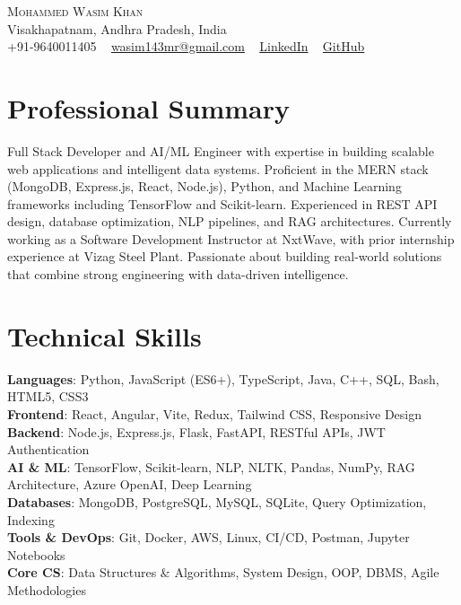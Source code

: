 \documentclass[letterpaper,11pt]{article}
\begin{document}
\begin{center}
  {\Huge \scshape Mohammed Wasim Khan} \\ \vspace{1pt}
  Visakhapatnam, Andhra Pradesh, India \\ \vspace{1pt}
  \small +91-9640011405 ~
  \href{mailto:wasim143mr@gmail.com}{wasim143mr@gmail.com} ~
  \href{https://linkedin.com/in/mohammed-wasim-khan-757595245}{LinkedIn} ~
  \href{https://github.com/wasim-builds}{GitHub}
  \vspace{-8pt}
\end{center}

\section{Professional Summary}
Full Stack Developer and AI/ML Engineer with expertise in building scalable web applications and intelligent data systems. Proficient in the MERN stack (MongoDB, Express.js, React, Node.js), Python, and Machine Learning frameworks including TensorFlow and Scikit-learn. Experienced in REST API design, database optimization, NLP pipelines, and RAG architectures. Currently working as a Software Development Instructor at NxtWave, with prior internship experience at Vizag Steel Plant. Passionate about building real-world solutions that combine strong engineering with data-driven intelligence.

\section{Technical Skills}
\begin{itemize}[leftmargin=0.15in, label={}]
  \small{\item{
    \textbf{Languages}{: Python, JavaScript (ES6+), TypeScript, Java, C++, SQL, Bash, HTML5, CSS3} \\
    \textbf{Frontend}{: React, Angular, Vite, Redux, Tailwind CSS, Responsive Design} \\
    \textbf{Backend}{: Node.js, Express.js, Flask, FastAPI, RESTful APIs, JWT Authentication} \\
    \textbf{AI \& ML}{: TensorFlow, Scikit-learn, NLP, NLTK, Pandas, NumPy, RAG Architecture, Azure OpenAI, Deep Learning} \\
    \textbf{Databases}{: MongoDB, PostgreSQL, MySQL, SQLite, Query Optimization, Indexing} \\
    \textbf{Tools \& DevOps}{: Git, Docker, AWS, Linux, CI/CD, Postman, Jupyter Notebooks} \\
    \textbf{Core CS}{: Data Structures \& Algorithms, System Design, OOP, DBMS, Agile Methodologies}
  }}
\end{itemize}
\vspace{-16pt}
\end{document}
